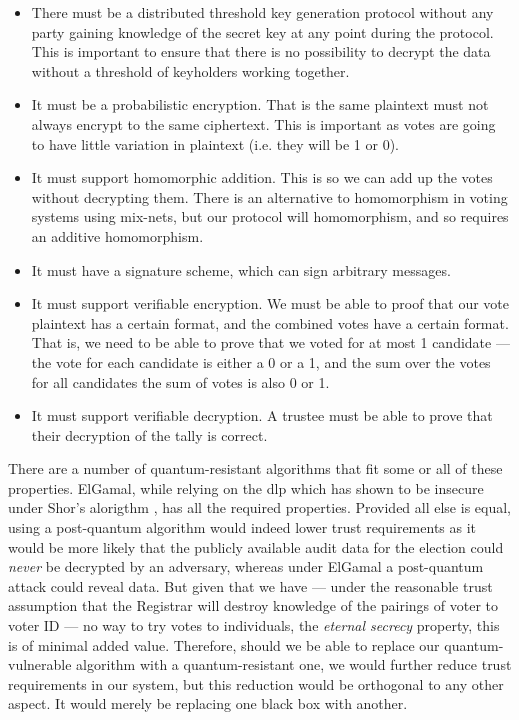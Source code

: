 \begin{itemize}
    \item There must be a distributed threshold key generation protocol without any party gaining knowledge of the secret key at any point during the protocol. This is important to ensure that there is no possibility to decrypt the data without a threshold of keyholders working together.
    \item It must be a probabilistic encryption. That is the same plaintext must not always encrypt to the same ciphertext. This is important as votes are going to have little variation in plaintext (i.e. they will be 1 or 0).
    \item It must support homomorphic addition. This is so we can add up the votes without decrypting them. There is an alternative to homomorphism in voting systems using mix-nets, but our protocol will homomorphism, and so requires an additive homomorphism.
    \item It must have a signature scheme, which can sign arbitrary messages.
    \item It must support verifiable encryption. We must be able to proof that our vote plaintext has a certain format, and the combined votes have a certain format. That is, we need to be able to prove that we voted for at most 1 candidate --- the vote for each candidate is either a 0 or a 1, and the sum over the votes for all candidates the sum of votes is also 0 or 1.
    \item It must support verifiable decryption. A trustee must be able to prove that their decryption of the tally is correct.
\end{itemize}

There are a number of quantum-resistant algorithms  that fit some or all of these properties. ElGamal, while relying on the \gls{dlp} which has shown to be insecure under Shor's alorigthm \cite{shorAlgorithmsQuantumComputation1994}, has all the required properties. Provided all else is equal, using a post-quantum algorithm would indeed lower trust requirements as it would be more likely that the publicly available audit data for the election could \emph{never} be decrypted by an adversary, whereas under ElGamal a post-quantum attack could reveal data. But given that we have --- under the reasonable trust assumption that the Registrar will destroy knowledge of the pairings of voter to voter ID --- no way to try votes to individuals, the \emph{eternal secrecy} property, this is of minimal added value. Therefore, should we be able to replace our quantum-vulnerable algorithm with a quantum-resistant one, we would further reduce trust requirements in our system, but this reduction would be orthogonal to any other aspect. It would merely be replacing one black box with another.

